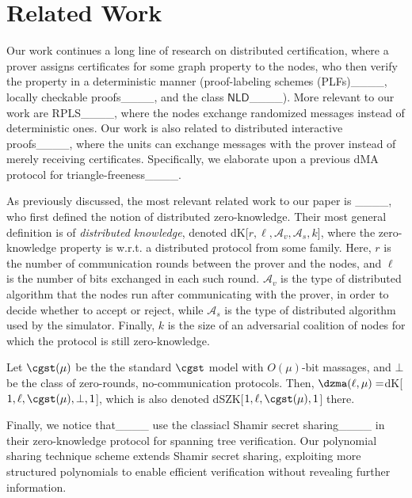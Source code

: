 \section{Related Work}
Our work continues a long line of research on distributed certification, where a prover assigns certificates for some graph property to the nodes, who then verify the property in a deterministic manner (proof-labeling schemes (PLFs)____, locally checkable proofs____, and the class $\mathsf{NLD}$____).
More relevant to our work are RPLS____, where the nodes   exchange randomized messages instead of deterministic ones.
Our work is also related to distributed interactive proofs____, where the units can exchange messages with the prover instead of merely receiving certificates. 
Specifically, we elaborate upon a previous dMA protocol for triangle-freeness____.

As previously discussed, the most relevant related work to our paper is ____, who first defined the notion of distributed zero-knowledge. 
%
%
Their most general definition is of \emph{distributed knowledge}, denoted dK[$r,\ell,\mathcal{A}_v,\mathcal{A}_s,k$],
where the zero-knowledge property is w.r.t. a distributed protocol from some family.
Here, $r$ is the number of communication rounds between the prover and the nodes, and $\ell$ is the number of bits exchanged in each such  round. 
$\mathcal{A}_v$ is the type of distributed algorithm that the nodes run after communicating with the prover, in order to decide whether to accept or reject, while
$\mathcal{A}_s$ is the type of distributed algorithm used by the simulator. 
Finally, $k$ is the size of an adversarial coalition of nodes for which the protocol is still zero-knowledge.
%

%
Let $\cgst(\mu)$ be the the standard $\cgst$ model with $O(\mu)$-bit massages,
and $\bot$ be the class of zero-rounds, no-communication protocols.
%
%
%
%
Then, $\dzma(\ell,\mu)=$dK[$1,\ell,\cgst(\mu),\bot,1$], which is also denoted dSZK[$1,\ell,\cgst(\mu),1$] there.

Finally, we notice that____ use the classiacl Shamir secret sharing____ in their zero-knowledge protocol for spanning tree verification. 
Our polynomial sharing technique scheme extends Shamir secret sharing, exploiting more structured polynomials to enable efficient verification without revealing further information.

%


%
%
%